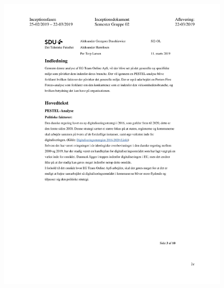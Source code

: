 \begin{figure}[hb]
  \includegraphics[scale = 0.33]{./PNG/Inceptions/Gruppe 02 + InceptionsDokument-37.jpg} 
\end{figure}

